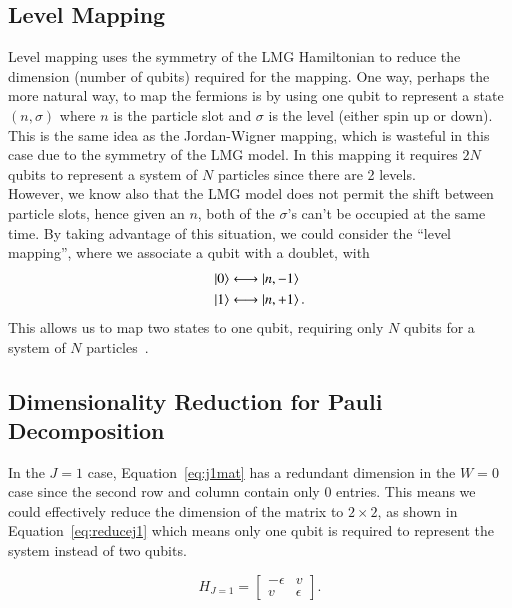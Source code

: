 \subsection{Level Mapping}
\label{subsec:level_mapping}
Level mapping uses the symmetry of the LMG Hamiltonian to reduce the dimension (number of qubits) required for the mapping. One way, perhaps the more natural way, to map the fermions is by using one qubit to represent a state $ (n,\sigma) $ where $ n $ is the particle slot and $ \sigma $ is the level (either spin up or down). This is the same idea as the Jordan-Wigner mapping, which is wasteful in this case due to the symmetry of the LMG model. In this mapping it requires $ 2N $ qubits to represent a system of $ N $ particles since there are 2 levels. \\
However, we know also that the LMG model does not permit the shift between particle slots, hence given an $ n $, both of the $ \sigma $'s can't be occupied at the same time. By taking advantage of this situation, we could consider the ``level mapping'', where we associate a qubit with a doublet, with 
\[ 
\begin{aligned}
\ket{0} &\longleftrightarrow \ket{n, -1} \\
\ket{1} &\longleftrightarrow \ket{n, +1}.
\end{aligned}\] 
This allows us to map two states to one qubit, requiring only $ N $ qubits for a system of $ N $ particles~\cite{Cervia21}. 

\subsection{Dimensionality Reduction for Pauli Decomposition}
\label{subsec:dim_reduction}
In the $ J=1 $ case, Equation~\eqref{eq:j1mat} has a redundant dimension in the $ W=0 $ case since the second row and column contain only $ 0 $ entries. This means we could effectively reduce the dimension of the matrix to $ 2 \times 2 $, as shown in Equation~\eqref{eq:reducej1} which means only one qubit is required to represent the system instead of two qubits. 

\begin{equation}
	\label{eq:reducej1}
	H_{J=1} = \begin{bmatrix}
		-\epsilon & v \\
		v & \epsilon
	\end{bmatrix}.
\end{equation}

